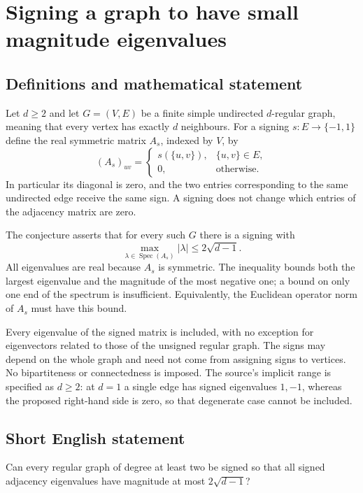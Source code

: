 \documentclass[11pt,a4paper]{article}
\begin{document}
\section*{Signing a graph to have small magnitude eigenvalues}\label{statement}

\subsection{Definitions and mathematical statement}
Let $d\ge2$ and let $G=(V,E)$ be a finite simple undirected $d$-regular
graph, meaning that every vertex has exactly $d$ neighbours.
For a signing $s:E\to\{-1,1\}$ define the real symmetric matrix
$A_s$, indexed by $V$, by
\[
 (A_s)_{uv}=\begin{cases}s(\{u,v\}),&\{u,v\}\in E,\\
                         0,&\text{otherwise}.\end{cases}
\]
In particular its diagonal is zero, and the two entries corresponding
to the same undirected edge receive the same sign. A signing does not
change which entries of the adjacency matrix are zero.

The conjecture asserts that for every such $G$ there is a signing with
\[
 \max_{\lambda\in\operatorname{Spec}(A_s)}|\lambda|
                 \le2\sqrt{d-1}.
\]
All eigenvalues are real because $A_s$ is symmetric. The inequality
bounds both the largest eigenvalue and the magnitude of the most
negative one; a bound on only one end of the spectrum is insufficient.
Equivalently, the Euclidean operator norm of $A_s$ must have this bound.

Every eigenvalue of the signed matrix is included, with no exception
for eigenvectors related to those of the unsigned regular graph.
The signs may depend on the whole graph and need not come from
assigning signs to vertices. No bipartiteness or connectedness is imposed.
The source's implicit range is specified as $d\ge2$: at $d=1$ a single
edge has signed eigenvalues $1,-1$, whereas the proposed right-hand
side is zero, so that degenerate case cannot be included.
\subsection{Short English statement}
Can every regular graph of degree at least two be signed so that all signed adjacency eigenvalues have magnitude at most $2\sqrt{d-1}$?
\end{document}
